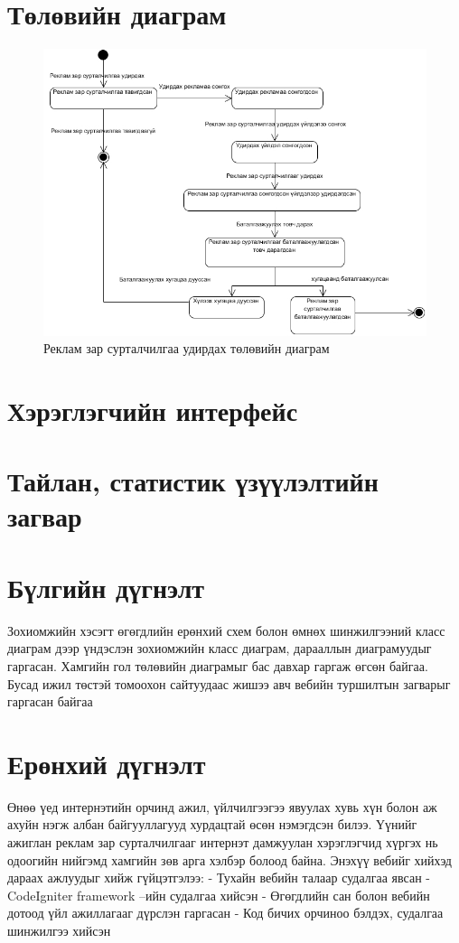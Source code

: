 \section{Төлөвийн диаграм }
	\begin{figure}[ht]

		\includegraphics[scale=0.55]{Diagrams/state}
		\caption[Реклам зар сурталчилгаа удирдах төлөвийн диаграм]{Реклам зар сурталчилгаа удирдах төлөвийн диаграм}
		\label{text}
	\end{figure}

\section{Хэрэглэгчийн интерфейс }
	
\section{Тайлан, статистик үзүүлэлтийн загвар }
	
\section{Бүлгийн дүгнэлт}
	Зохиомжийн хэсэгт өгөгдлийн ерөнхий схем болон өмнөх шинжилгээний класс диаграм дээр үндэслэн зохиомжийн класс диаграм, дарааллын диаграмуудыг гаргасан. Хамгийн гол төлөвийн диаграмыг бас давхар гаргаж өгсөн байгаа. Бусад ижил төстэй томоохон сайтуудаас жишээ авч вебийн туршилтын загварыг гаргасан байгаа
\section{Ерөнхий дүгнэлт}
	Өнөө үед интернэтийн орчинд ажил, үйлчилгээгээ явуулах хувь хүн болон аж ахуйн нэгж албан байгууллагууд хурдацтай өсөн нэмэгдсэн билээ. Үүнийг ажиглан реклам зар сурталчилгааг интернэт дамжуулан хэрэглэгчид хүргэх нь одоогийн нийгэмд хамгийн зөв арга хэлбэр болоод байна. Энэхүү вебийг хийхэд дараах ажлуудыг хийж гүйцэтгэлээ:
	-	Тухайн вебийн талаар судалгаа явсан
	-	CodeIgniter framework –ийн судалгаа хийсэн
	-	Өгөгдлийн сан болон вебийн дотоод үйл ажиллагааг дүрслэн гаргасан
	-	Код бичих орчиноо бэлдэх, судалгаа шинжилгээ хийсэн
	
